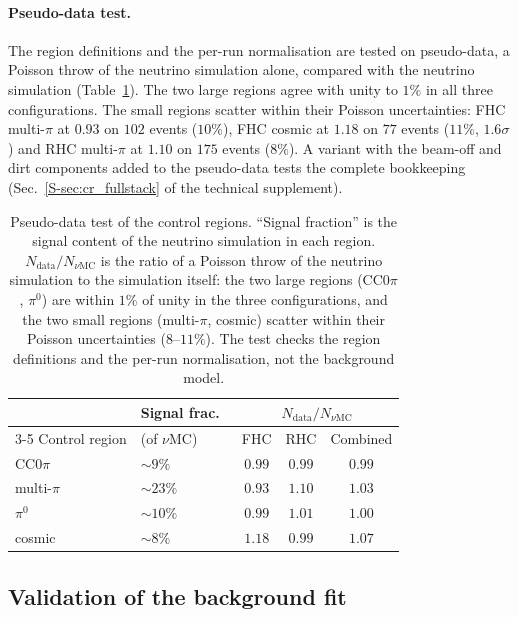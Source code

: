 \documentclass[11pt,a4paper]{article}
\newcommand{\suppref}[2]{#1~\ref{S-#2} of the technical supplement}
\begin{document}
\paragraph{Pseudo-data test.}
The region definitions and the per-run normalisation are tested on pseudo-data, a Poisson throw of the neutrino simulation alone, compared with the neutrino
simulation (Table~\ref{tab:sidebands}). The two large regions agree with unity to $1\%$ in all three
configurations. The small regions scatter within their Poisson uncertainties: FHC multi-$\pi$ at
$0.93$ on $102$ events ($10\%$), FHC cosmic at $1.18$ on $77$ events ($11\%$, $1.6\sigma$) and RHC
multi-$\pi$ at $1.10$ on $175$ events ($8\%$). A variant with the beam-off and dirt components added
to the pseudo-data tests the complete bookkeeping (\suppref{Sec.}{sec:cr_fullstack}).

\begin{table}[H]
  \centering
  \caption{Pseudo-data test of the control regions. ``Signal fraction'' is the signal content of
    the neutrino simulation in each region. $N_\mathrm{data}/N_{\nu\mathrm{MC}}$ is the ratio of a
    Poisson throw of the neutrino simulation to the simulation itself: the two large regions
    (CC$0\pi$, $\pi^0$) are within $1\%$ of unity in the three configurations, and the two small
    regions (multi-$\pi$, cosmic) scatter within their Poisson uncertainties ($8$--$11\%$). The test
    checks the region definitions and the per-run normalisation, not the background model.}
  \label{tab:sidebands}
  \begin{tabular}{llccc}
    \toprule
    & Signal frac.\ & \multicolumn{3}{c}{$N_\mathrm{data}/N_{\nu\mathrm{MC}}$} \\
    \cmidrule(lr){3-5}
    Control region & (of $\nu$MC) & FHC & RHC & Combined \\
    \midrule
    CC$0\pi$      & $\sim9\%$ & $0.99$ & $0.99$ & $0.99$ \\
    multi-$\pi$   & $\sim23\%$ & $0.93$ & $1.10$ & $1.03$ \\
    $\pi^0$       & $\sim10\%$ & $0.99$ & $1.01$ & $1.00$ \\
    cosmic        & $\sim8\%$ & $1.18$ & $0.99$ & $1.07$ \\
    \bottomrule
  \end{tabular}
\end{table}



\subsection{Validation of the background fit}
\end{document}
